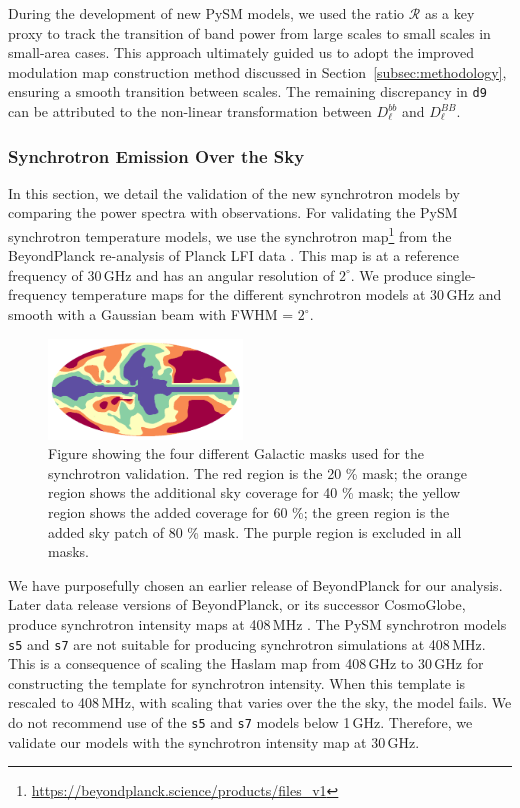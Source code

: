 \documentclass[twocolumn]{aastex631}
\begin{document}
During the development of new PySM models, we used the ratio $\mathcal{R}$ as a key proxy to track the transition of band power from large scales to small scales in small-area cases. This approach ultimately guided us to adopt the improved modulation map construction method discussed in Section~\ref{subsec:methodology}, ensuring a smooth transition between scales. The remaining discrepancy in \texttt{d9} can be attributed to the non-linear transformation between $D_\ell^{bb}$ and $D_\ell^{BB}$.

\subsubsection{Synchrotron Emission Over the Sky} \label{sec:sync_validation}

In this section, we detail the validation of the new synchrotron models by comparing the power spectra with observations. For validating the PySM synchrotron temperature models, we use the synchrotron map\footnote{\url{https://beyondplanck.science/products/files\_v1}} from the BeyondPlanck re-analysis of Planck LFI data \citep{Andersen:2023}. This map is at a reference frequency of 30\,GHz and has an angular resolution of $2^\circ$. We produce single-frequency temperature maps for the different synchrotron models at 30\,GHz and smooth with a Gaussian beam with FWHM = $2^\circ$.

\begin{figure}
    \centering
    \includegraphics[width=0.46\textwidth]{figures/SYNC_mask_stack.png}
    \caption{Figure showing the four different Galactic masks used for the synchrotron validation. The red region is the 20 \% mask; the orange region shows the additional sky coverage for 40 \% mask; the yellow region shows the added coverage for 60 \%; the green region is the added sky patch of 80 \% mask. The purple region is excluded in all masks. }
    \label{fig:sync_masks}
\end{figure}

We have purposefully chosen an earlier release of BeyondPlanck for our analysis. Later data release versions of BeyondPlanck, or its successor CosmoGlobe, produce synchrotron intensity maps at 408\,MHz \citep{Watts:2023a}. The PySM synchrotron models \texttt{s5} and \texttt{s7} are not suitable for producing synchrotron simulations at 408\,MHz. This is a consequence of scaling the Haslam map from 408\,GHz to 30\,GHz for constructing the template for synchrotron intensity. When this template is rescaled to 408\,MHz, with scaling that varies over the the sky, the model fails. We do not recommend use of the \texttt{s5} and \texttt{s7} models below 1\,GHz. Therefore, we validate our models with the synchrotron intensity map at 30\,GHz.
\end{document}
